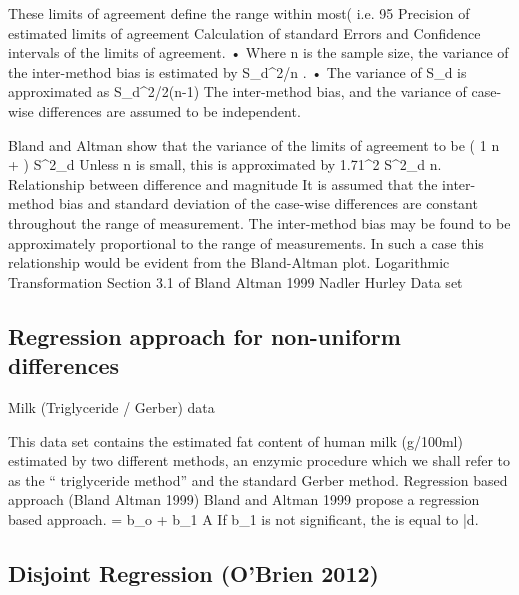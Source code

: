 These limits of agreement define the range within most( i.e. 95%
Precision of estimated limits of agreement
Calculation of standard Errors and Confidence intervals of the limits of agreement.
•	Where n is the sample size, the variance of the inter-method bias is estimated by S_d^2/n .
•	The variance of S_d  is approximated as S_d^2/2(n-1)
The inter-method bias, and the variance of case-wise differences are assumed to be independent.



Bland and Altman show that the variance of the limits of agreement to be
\left( {1 \over n} +  \right) S^2_d
Unless n is small, this is approximated by 1.71^2 {S^2_d \over n}.
Relationship between difference and magnitude
It is assumed that the inter-method bias and standard deviation of the case-wise differences are constant throughout the range of measurement.
The inter-method bias may be found to be approximately proportional to the range of measurements. In such a case this relationship would be evident from the Bland-Altman plot.
Logarithmic Transformation
	Section 3.1 of Bland Altman 1999
	Nadler Hurley Data set

\subsection{Regression approach for non-uniform differences}

Milk (Triglyceride /  Gerber) data

This data set contains the estimated fat content of human milk (g/100ml) estimated by two different methods, an enzymic procedure which we shall refer to as the “ triglyceride method” and the standard Gerber method.
Regression based approach (Bland Altman 1999)
Bland and Altman 1999 propose a regression based approach.
 = b_o + b_1 A
If b_1 is not significant, the  is equal to \bar{d}.


\subsection{Disjoint Regression (O’Brien 2012)}

